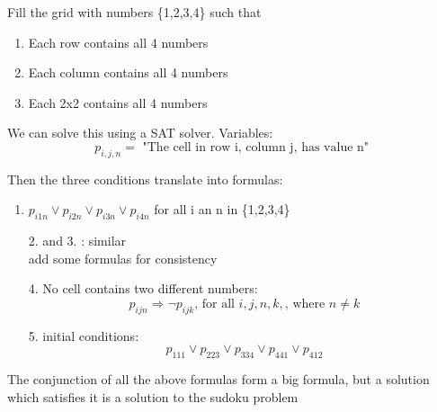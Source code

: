 \documentclass{article}
\begin{document}
Fill the grid with numbers \{1,2,3,4\} such that
\begin{enumerate}
    \item Each row contains all 4 numbers
    \item Each column contains all 4 numbers
    \item Each 2x2 contains all 4 numbers
\end{enumerate}
We can solve this using a SAT solver. Variables:
\[
    p _{i,j,n} = \text{ "The cell in row i, column j, has value n" }
\]

Then the three conditions translate into formulas:
\begin{enumerate}
    \item $p _{i1n} \lor p _{i2n} \lor p _{i3n} \lor p _{i4n} $ for all i an n in \{1,2,3,4\}
    \item [2.] and 3. : similar
          \\ add some formulas for consistency
    \item [4.] No cell contains two different numbers: \[
              p _{ijn} \Rightarrow \lnot p _{ijk} \text{, for all } i,j,n,k, \text{, where } n \ne k
          \]
    \item [5.] initial conditions: \[
              p _{111} \lor p _{223} \lor p _{334} \lor p _{441} \lor p _{412}
          \]
\end{enumerate}
The conjunction of all the above formulas form a big formula, but a solution which satisfies it is a solution to the sudoku problem
\end{document}
